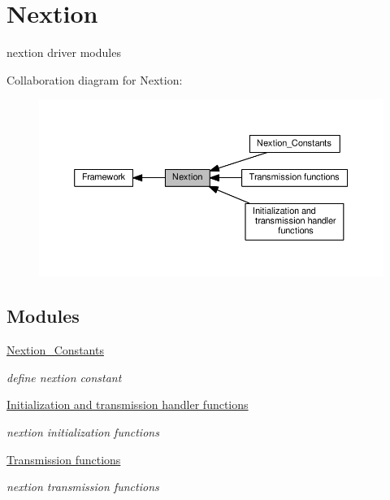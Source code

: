 \hypertarget{group__nextion}{}\section{Nextion}
\label{group__nextion}


nextion driver modules  


Collaboration diagram for Nextion\+:\nopagebreak
\begin{figure}[H]
\begin{center}
\leavevmode
\includegraphics[width=350pt]{da/dd5/group__nextion}
\end{center}
\end{figure}
\subsection*{Modules}
\begin{DoxyCompactItemize}
\item 
\hyperlink{group__nextion___constants}{Nextion\+\_\+\+Constants}
\begin{DoxyCompactList}\small\item\em define nextion constant \end{DoxyCompactList}\item 
\hyperlink{group__nextion___init}{Initialization and transmission handler functions}
\begin{DoxyCompactList}\small\item\em nextion initialization functions \end{DoxyCompactList}\item 
\hyperlink{group__nextion___trans}{Transmission functions}
\begin{DoxyCompactList}\small\item\em nextion transmission functions \end{DoxyCompactList}\end{DoxyCompactItemize}
